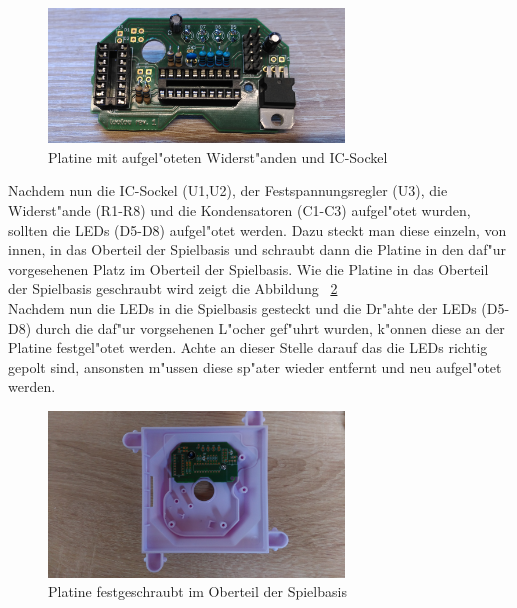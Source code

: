 \vspace{1cm}
\begin{figure}[!ht]
	\centering
  	\includegraphics[width=0.7\textwidth]{pictures/loolou_018.jpg}
	\caption{Platine mit aufgel"oteten Widerst"anden und IC-Sockel}
	\label{fig18}
\end{figure}
\vspace{0.5cm}

Nachdem nun die IC-Sockel (U1,U2), der Festspannungsregler (U3), die Widerst"ande (R1-R8) und die Kondensatoren (C1-C3) aufgel"otet wurden, sollten die LEDs (D5-D8) aufgel"otet werden. Dazu steckt man diese einzeln, von innen, in das Oberteil der Spielbasis und schraubt dann die Platine in den daf"ur vorgesehenen Platz im Oberteil der Spielbasis. Wie die Platine in das Oberteil der Spielbasis geschraubt wird zeigt die Abbildung ~\ref{fig19} \\
Nachdem nun die LEDs in die Spielbasis gesteckt und die Dr"ahte der LEDs (D5-D8) durch die daf"ur vorgsehenen L"ocher gef"uhrt wurden, k"onnen diese an der Platine festgel"otet werden. Achte an dieser Stelle darauf das die LEDs richtig gepolt sind, ansonsten m"ussen diese sp"ater wieder entfernt und neu aufgel"otet werden.

\vspace{1cm}
\begin{figure}[!ht]
	\centering
  	\includegraphics[width=0.7\textwidth]{pictures/loolou_019.jpg}
	\caption{Platine festgeschraubt im Oberteil der Spielbasis}
	\label{fig19}
\end{figure}
\vspace{0.5cm}


